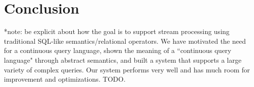\documentclass[a4paper, 10pt, conference]{IEEEconf}
\begin{document}
\section{Conclusion}
*note: be explicit about how the goal is to support stream processing using traditional SQL-like semantics/relational operators. We have motivated the need for a continuous query language, shown the meaning of a ``continuous query language" through abstract semantics, and built a system that supports a large variety of complex queries.  Our system performs very well and has much room for improvement and optimizations.  TODO.



\end{document}
